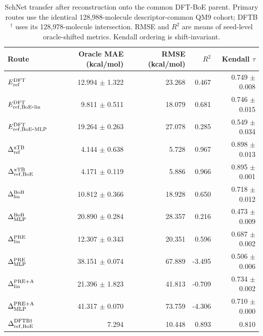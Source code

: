 \begin{table}[H]
\centering
\scriptsize
\setlength{\tabcolsep}{4pt}
\renewcommand{\arraystretch}{1.35}
\caption{SchNet transfer after reconstruction onto the common DFT-BoE parent. Primary routes use the identical 128,988-molecule descriptor-common QM9 cohort; DFTB$^\dagger$ uses its 128,978-molecule intersection. RMSE and $R^2$ are means of seed-level oracle-shifted metrics. Kendall ordering is shift-invariant.}
\begin{tabular}{lrrrr}
\toprule
Route & Oracle MAE (kcal/mol) & RMSE (kcal/mol) & $R^2$ & Kendall $\tau$ \\
\midrule
\(E_{\rm ref}^{\rm DFT}\) & 12.994 $\pm$ 1.322 & 23.268 & 0.467 & 0.749 $\pm$ 0.008 \\
\(E_{\rm ref,BoE\mbox{-}lin}^{\rm DFT}\) & 9.811 $\pm$ 0.511 & 18.079 & 0.681 & 0.746 $\pm$ 0.015 \\
\(E_{\rm ref,BoE\mbox{-}MLP}^{\rm DFT}\) & 19.264 $\pm$ 0.263 & 27.078 & 0.285 & 0.549 $\pm$ 0.034 \\
\(\Delta^{\rm xTB}_{\rm ref}\) & 4.144 $\pm$ 0.638 & 5.728 & 0.967 & 0.898 $\pm$ 0.013 \\
\(\Delta^{\rm xTB}_{\rm ref,BoE}\) & 4.171 $\pm$ 0.119 & 5.886 & 0.966 & 0.895 $\pm$ 0.001 \\
\(\Delta^{\rm BoB}_{\rm lin}\) & 10.812 $\pm$ 0.366 & 18.928 & 0.650 & 0.718 $\pm$ 0.012 \\
\(\Delta^{\rm BoB}_{\rm MLP}\) & 20.890 $\pm$ 0.284 & 28.357 & 0.216 & 0.473 $\pm$ 0.009 \\
\(\Delta^{\rm PRE}_{\rm lin}\) & 12.307 $\pm$ 0.343 & 20.351 & 0.596 & 0.687 $\pm$ 0.002 \\
\(\Delta^{\rm PRE}_{\rm MLP}\) & 38.151 $\pm$ 0.074 & 67.889 & -3.495 & 0.506 $\pm$ 0.006 \\
\(\Delta^{\rm PRE+A}_{\rm lin}\) & 21.396 $\pm$ 1.823 & 41.813 & -0.709 & 0.734 $\pm$ 0.002 \\
\(\Delta^{\rm PRE+A}_{\rm MLP}\) & 41.317 $\pm$ 0.070 & 73.759 & -4.306 & 0.710 $\pm$ 0.000 \\
\(\Delta^{\rm DFTB\dagger}_{\rm ref,BoE}\) & 7.294 & 10.448 & 0.893 & 0.810 \\
\bottomrule
\end{tabular}
\end{table}
